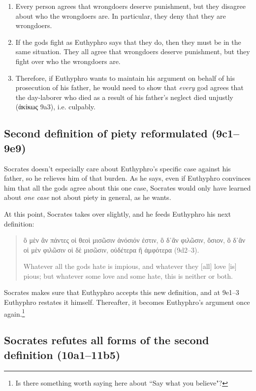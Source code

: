 \documentclass[11pt]{article}
\begin{document}
\begin{enumerate}
    \item Every person agrees that wrongdoers deserve punishment, but they disagree about who the wrongdoers are.  In particular, they deny that they are wrongdoers.
    \item If the gods fight as Euthyphro says that they do, then they must be in the same situation.  They all agree that wrongdoers deserve punishment, but they fight over who the wrongdoers are.
    \item Therefore, if Euthyphro wants to maintain his argument on behalf of his prosecution of his father, he would need to show that \emph{every} god agrees that the day-laborer who died as a result of his father's neglect died unjustly ({\g ἀκίκως} 9a3), i.e. culpably.
\end{enumerate}

\subsection{Second definition of piety reformulated (9c1--9e9)}

Socrates doesn't especially care about Euthyphro's specific case against his father, so he relieves him of that burden.  As he says, even if Euthyphro convinces him that all the gods agree about this one case, Socrates would only have learned about \emph{one case} not about piety in general, as he wants.

At this point, Socrates takes over slightly, and he feeds Euthyphro his next definition:

\begin{quote}
    {\g ὃ μὲν ἂν πάντες οἱ θεοὶ μισῶσιν ἀνόσιόν ἐστιν, ὃ δ᾽ἂν φιλῶσιν, ὅσιον, ὃ δ᾽ἂν οἱ μὲν φιλῶσιν οἱ δὲ μισῶσιν, οὐδέτερα ἢ ἀμφότερα} (9d2--3).

    Whatever all the gods hate is impious, and whatever they [all] love [is] pious; but whatever some love and some hate, this is neither or both.
\end{quote}

Socrates makes sure that Euthyphro accepts this new definition, and at 9e1--3 Euthyphro restates it himself.  Thereafter, it becomes Euthyphro's argument once again.\footnote{Is there something worth saying here about ``Say what you believe"?}

\subsection{Socrates refutes all forms of the second definition (10a1--11b5)}
\end{document}
